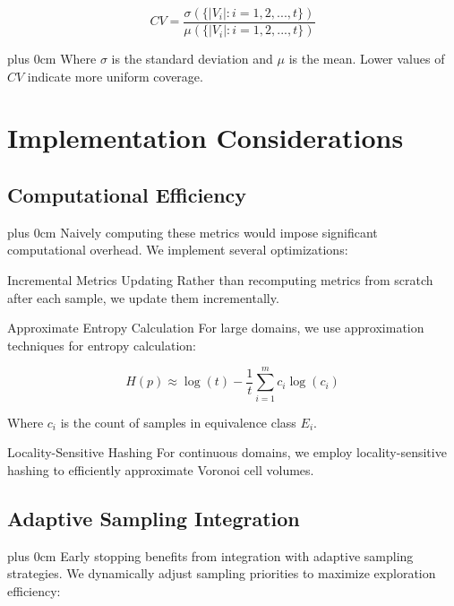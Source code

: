 \documentclass[conference]{IEEEtran}
\newcommand{\justifytext}{\leftskip=0pt \rightskip=0pt plus 0cm}
\begin{document}
\begin{equation}
CV = \frac{\sigma(\{|V_i| : i = 1,2,...,t\})}{\mu(\{|V_i| : i = 1,2,...,t\})}
\end{equation}

\justifytext
Where $\sigma$ is the standard deviation and $\mu$ is the mean. Lower values of $CV$ indicate more uniform coverage.

\section{Implementation Considerations}

\subsection{Computational Efficiency}

\justifytext
Naively computing these metrics would impose significant computational overhead. We implement several optimizations:

\begin{examplebox}{Incremental Metrics Updating}
Rather than recomputing metrics from scratch after each sample, we update them incrementally.
\end{examplebox}

\begin{examplebox}{Approximate Entropy Calculation}
For large domains, we use approximation techniques for entropy calculation:

\begin{equation}
H(p) \approx \log(t) - \frac{1}{t}\sum_{i=1}^{m}c_i\log(c_i)
\end{equation}

Where $c_i$ is the count of samples in equivalence class $E_i$.
\end{examplebox}

\begin{examplebox}{Locality-Sensitive Hashing}
For continuous domains, we employ locality-sensitive hashing to efficiently approximate Voronoi cell volumes.
\end{examplebox}

\subsection{Adaptive Sampling Integration}

\justifytext
Early stopping benefits from integration with adaptive sampling strategies. We dynamically adjust sampling priorities to maximize exploration efficiency:
\end{document}
